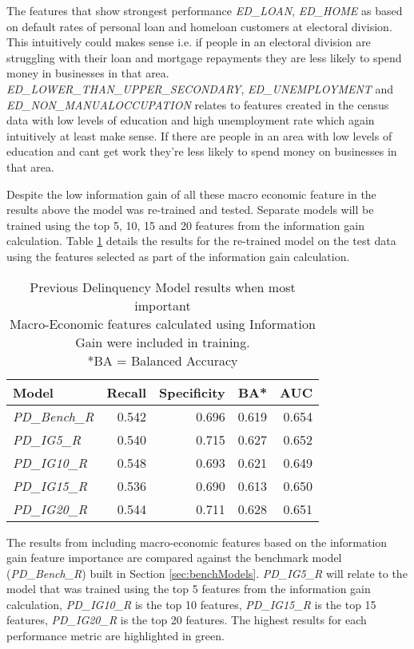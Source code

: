 The features that show strongest performance \textit{ED\_LOAN}, \textit{ED\_HOME} as based on default rates of personal loan and homeloan customers at electoral division. This intuitively could makes sense i.e. if people in an electoral division are struggling with their loan and mortgage repayments they are less likely to spend money in businesses in that area. \textit{ED\_LOWER\_THAN\_UPPER\_SECONDARY}, \textit{ED\_UNEMPLOYMENT} and \textit{ED\_NON\_MANUALOCCUPATION} relates to features created in the census data with low levels of education and high unemployment rate which again intuitively at least make sense. If there are people in an area with low levels of education and cant get work they're less likely to spend money on businesses in that area.

Despite the low information gain of all these macro economic feature in the results above the model was re-trained and tested. Separate models will be trained using the top 5, 10, 15 and 20 features from the information gain calculation. Table \ref{table:InfoGainPDModelResults} details the results for the re-trained model on the test data using the features selected as part of the information gain calculation.

\begin{table}[H]
\centering
\small
		\begin{tabular}{l r r r r}
			\hline
			\textbf{Model} & \textbf{Recall} & \textbf{Specificity} & \textbf{BA*} & \textbf{AUC}  \\ \hline
			\textit{PD\_Bench\_R} & 0.542 & 0.696 & 0.619 & \cellcolor{green!25}0.654 \\ \hline
			\textit{PD\_IG5\_R} & 0.540 & \cellcolor{green!25}0.715 & 0.627 & 0.652   \\ 
			\textit{PD\_IG10\_R} & \cellcolor{green!25}0.548 & 0.693 & 0.621 & 0.649  \\ 
			\textit{PD\_IG15\_R} & 0.536 & 0.690 & 0.613 & 0.650  \\
			\textit{PD\_IG20\_R} & 0.544 & 0.711 & \cellcolor{green!25}0.628 & 0.651 \\\hline 
		\end{tabular}
	\caption{Previous Delinquency Model results when most important \\Macro-Economic features calculated using Information Gain were included in training.\\
		*BA = Balanced Accuracy}
	\label{table:InfoGainPDModelResults}
\end{table}

The results from including macro-economic features based on the information gain feature importance are compared against the benchmark model (\textit{PD\_Bench\_R}) built in Section \ref{sec:benchModels}. \textit{PD\_IG5\_R} will relate to the model that was trained using the top 5 features from the information gain calculation, \textit{PD\_IG10\_R} is the top 10 features, \textit{PD\_IG15\_R} is the top 15 features, \textit{PD\_IG20\_R} is the top 20 features. The highest results for each performance metric are highlighted in green.

